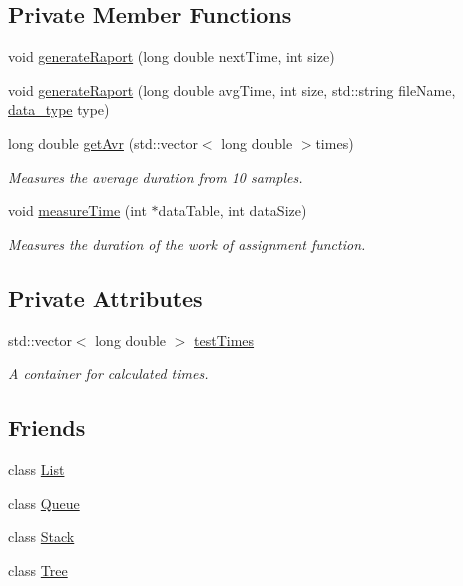 \subsection*{Private Member Functions}
\begin{DoxyCompactItemize}
\item 
void \hyperlink{class_benchmark_abf697c20cfadd6d084cd32bc2c9f6c9f}{generate\+Raport} (long double next\+Time, int size)
\item 
void \hyperlink{class_benchmark_a5a3439fc5d0841cada080cdd14c9ebd1}{generate\+Raport} (long double avg\+Time, int size, std\+::string file\+Name, \hyperlink{benchmark__frm_8h_ac2ad7f431e3446fddcd9b6b9f93c4c14}{data\+\_\+type} type)
\item 
long double \hyperlink{class_benchmark_a3efa1ec3d4e76eb0fa1633dda265c711}{get\+Avr} (std\+::vector$<$ long double $>$times)
\begin{DoxyCompactList}\small\item\em Measures the average duration from 10 samples. \end{DoxyCompactList}\item 
void \hyperlink{class_benchmark_a2256d13e70e2e5f0df7583118dd88d49}{measure\+Time} (int $\ast$data\+Table, int data\+Size)
\begin{DoxyCompactList}\small\item\em Measures the duration of the work of assignment function. \end{DoxyCompactList}\end{DoxyCompactItemize}
\subsection*{Private Attributes}
\begin{DoxyCompactItemize}
\item 
std\+::vector$<$ long double $>$ \hyperlink{class_benchmark_a5563f218941d6b01ac7783f1e6582025}{test\+Times}
\begin{DoxyCompactList}\small\item\em A container for calculated times. \end{DoxyCompactList}\end{DoxyCompactItemize}
\subsection*{Friends}
\begin{DoxyCompactItemize}
\item 
class \hyperlink{class_benchmark_a8cee552d09eaeb60a09d95309a87b498}{List}
\item 
class \hyperlink{class_benchmark_a47dfc6f2bc0d50a6e7c92eb00d97b064}{Queue}
\item 
class \hyperlink{class_benchmark_a4641b458711966e157e765a8aef3476c}{Stack}
\item 
class \hyperlink{class_benchmark_a4b682814d14447120dd184fd300deade}{Tree}
\end{DoxyCompactItemize}


